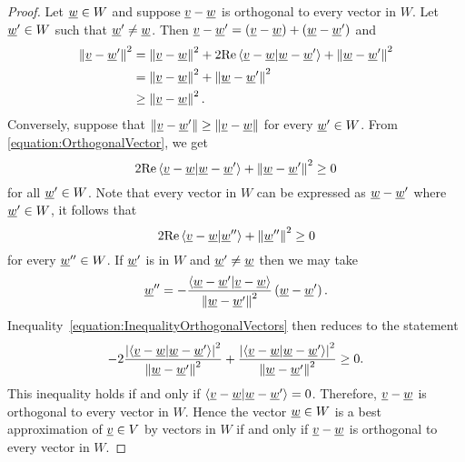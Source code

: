 \begin{proof}
Let $\underline{w} \in W$ and suppose $\underline{v} - \underline{w}$ is orthogonal to every vector in $W$.
Let $\underline{w}' \in W$ such that $\underline{w}' \neq \underline{w}$.
Then $\underline{v} - \underline{w}' = \left( \underline{v} - \underline{w} \right) + \left( \underline{w} - \underline{w}' \right)$ and
\begin{equation} \label{equation:OrthogonalVector}
\begin{split}
\left\| \underline{v} - \underline{w}' \right\|^2
&= \left\| \underline{v} - \underline{w} \right\|^2
+ 2 \mathrm{Re} \left\langle \underline{v} - \underline{w} | \underline{w} - \underline{w}' \right\rangle
+ \left\| \underline{w} - \underline{w}' \right\|^2 \\
&= \left\| \underline{v} - \underline{w} \right\|^2
+ \left\| \underline{w} - \underline{w}' \right\|^2 \\
&\geq \left\| \underline{v} - \underline{w} \right\|^2.
\end{split}
\end{equation}
Conversely, suppose that $\left\| \underline{v} - \underline{w}' \right\| \geq \left\| \underline{v} - \underline{w} \right\|$ for every $\underline{w}' \in W$.
From \eqref{equation:OrthogonalVector}, we get
\begin{equation*}
2 \mathrm{Re} \left\langle \underline{v} - \underline{w} | \underline{w} - \underline{w}' \right\rangle
+ \left\| \underline{w} - \underline{w}' \right\|^2 \geq 0
\end{equation*}
for all $\underline{w}' \in W$.
Note that every vector in $W$ can be expressed as $\underline{w} - \underline{w}'$ where $\underline{w}' \in W$, it follows that
\begin{equation} \label{equation:InequalityOrthogonalVectors}
2 \mathrm{Re} \left\langle \underline{v} - \underline{w} | \underline{w}'' \right\rangle
+ \left\| \underline{w}'' \right\|^2 \geq 0
\end{equation}
for every $\underline{w}'' \in W$.
If $\underline{w}'$ is in $W$ and $\underline{w}' \neq \underline{w}$ then we may take
\begin{equation*}
\underline{w}'' = - \frac{ \left\langle  \underline{w} - \underline{w}' | \underline{v} - \underline{w} \right\rangle }{ \left\| \underline{w} - \underline{w}' \right\|^2 } \left( \underline{w} - \underline{w}' \right).
\end{equation*}
Inequality~\eqref{equation:InequalityOrthogonalVectors} then reduces to the statement
\begin{equation*}
- 2 \frac{ \left| \left\langle \underline{v} - \underline{w} | \underline{w} - \underline{w}' \right\rangle \right|^2 }{ \left\| \underline{w} - \underline{w}' \right\|^2 }
+ \frac{ \left| \left\langle \underline{v} - \underline{w} | \underline{w} - \underline{w}' \right\rangle \right|^2 }{ \left\| \underline{w} - \underline{w}' \right\|^2 }
\geq 0.
\end{equation*}
This inequality holds if and only if $\left\langle \underline{v} - \underline{w} | \underline{w} - \underline{w}' \right\rangle = 0$.
Therefore, $\underline{v} - \underline{w}$ is orthogonal to every vector in $W$.
Hence the vector $\underline{w} \in W$ is a best approximation of $\underline{v} \in V$ by vectors in $W$ if and only if $\underline{v} - \underline{w}$ is orthogonal to every vector in $W$.


\end{proof}
